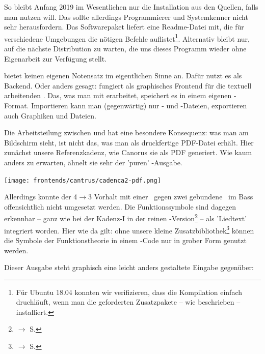 So bleibt Anfang 2019 im Wesentlichen nur die Installation aus den Quellen,
falls man  nutzen will. Das sollte allerdings Programmierer und
Systemkenner nicht sehr herausfordern. Das Softwarepaket liefert eine
Readme-Datei mit, die für verschiedene Umgebungen die nötigen Befehle
auflistet\footnote{Für Ubuntu 18.04 konnten wir verifizieren, dass die
Kompilation einfach druchläuft, wenn man die geforderten Zusatzpakete -- wie
beschrieben -- installiert.}. Alternativ bleibt nur, auf die nächste
Distribution zu warten, die uns dieses Programm wieder ohne Eigenarbeit zur
Verfügung stellt.

 bietet keinen eigenen Notensatz im eigentlichen Sinne an. Dafür
nutzt es  als Backend. Oder anders gesagt:  fungiert
als graphisches Frontend für die textuell arbeitenden . Das, was
man mit  erarbeitet, speichert es in einem eigenen
-Format. Importieren kann man (gegenwärtig) nur - und
-Dateien, exportieren auch Graphiken und Dateien.

Die Arbeitsteilung zwischen  und  hat eine besondere
Konsequenz: was man am Bildschirm sieht, ist nicht das, was man als druckfertige
PDF-Datei erhält. Hier zunächst unsere Referenzkadenz, wie Canorus sie als PDF
generiert. Wie kaum anders zu erwarten, ähnelt sie sehr der 'puren'
-Ausgabe.

\begin{center}
\texttt{[image: frontends/cantrus/cadenca2-pdf.png]}
\end{center}

Allerdings konnte der 4$\rightarrow$3 Vorhalt mit einer \Halb\ gegen zwei
gebundene \Vier\ im Bass offensichtlich nicht umgesetzt werden. Die
Funktionssymbole sind dagegen erkennbar -- ganz wie bei der Kadenz-I in der
reinen -Version\footnote{$\rightarrow$ S.
\pageref{LilyPondKadenzI}} -- als 'Liedtext' integriert worden. Hier wie da
gilt: ohne unsere kleine Zusatzbibliothek\footnote{$\rightarrow$ S.
\pageref{LilyPondFuncTheory}} können die Symbole der Funktionstheorie in einem
-Code nur in grober Form genutzt werden.

Dieser Ausgabe steht graphisch eine leicht anders gestaltete Eingabe gegenüber:

